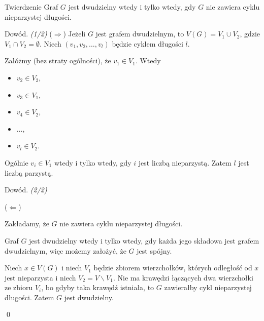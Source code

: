 \documentclass[a4paper,10pt]{beamer}
\begin{document}
\begin{frame}

\begin{block}{Twierdzenie}
Graf $G$ jest dwudzielny wtedy i tylko wtedy, gdy  $G$ nie zawiera cyklu nieparzystej długości.
\end{block}

\begin{block}{Dowód. {\it (1/2)}}
($\Rightarrow$)
Jeżeli $G$ jest grafem dwudzielnym, to $V(G)=V_1\cup V_2$, gdzie $V_1\cap V_2=\emptyset$. Niech $(v_1,v_2,\ldots,v_l)$ będzie cyklem długości $l$. 

\begin{minipage}{.38\textwidth}
Załóżmy (bez straty ogólności), że $v_1\in V_1$. Wtedy 
\begin{itemize}
\item $v_2\in V_2$,
\item $v_3\in V_1$,
\item $v_4\in V_2$,
\item $\ldots$,
\item $v_l\in V_2$.
\end{itemize}
Ogólnie $v_i\in V_1$ wtedy i tylko wtedy, gdy $i$ jest liczbą nieparzystą. Zatem $l$ jest liczbą parzystą.
\end{minipage}\hfill\begin{minipage}{.58\textwidth}
\begin{center}

\end{center}
\end{minipage}
\end{block}
\end{frame}


\begin{frame}

\begin{block}{Dowód. {\it (2/2)}}

($\Leftarrow$)

Zakładamy, że $G$ nie zawiera cyklu nieparzystej długości. 

\medskip

Graf $G$ jest dwudzielny wtedy i tylko wtedy, gdy każda jego składowa jest grafem dwudzielnym, więc możemy założyć, że $G$ jest spójny.

\medskip

Niech $x\in V(G)$ i niech $V_1$ będzie zbiorem wierzchołków, których odległość od $x$ jest nieparzysta i niech $V_2=V\backslash V_1$. Nie ma krawędzi łączących dwa wierzchołki ze zbioru $V_i$, bo gdyby taka krawędź istniała, to $G$ zawierałby cykl nieparzystej długości. Zatem $G$ jest dwudzielny.

\vfill\qed
\end{block}


\end{frame}
\end{document}

